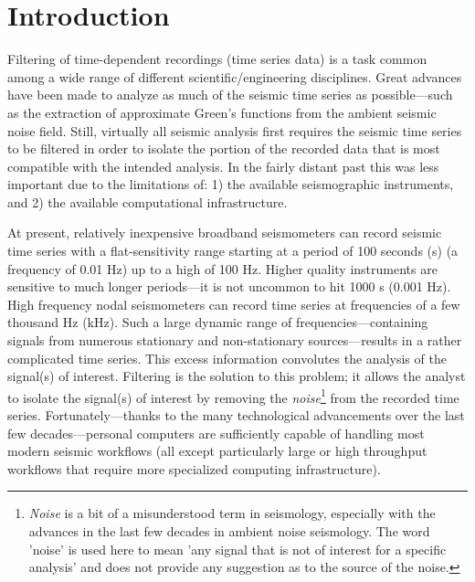 \documentclass[american, twoside]{article}
\begin{document}
\section{Introduction} \label{Introduction}
Filtering of time-dependent recordings (time series data) is a task common among a wide range of different scientific/engineering disciplines.
Great advances have been made to analyze as much of the seismic time series as possible---such as the extraction of approximate
Green's functions from the ambient seismic noise field. Still, virtually all seismic analysis first requires the seismic time series to
be filtered in order to isolate the portion of the recorded data that is most compatible with the intended analysis. In the fairly
distant past this was less important due to the limitations of: 1) the available seismographic instruments, and 2) the available
computational infrastructure.

At present, relatively inexpensive broadband seismometers can record seismic time series with a flat-sensitivity
range starting at a \gls{period} of 100 seconds (s) (a \gls{frequency} of 0.01 Hz) up to a high of 100 Hz. Higher quality instruments are sensitive to
much longer \glspl{period}---it is not uncommon to hit 1000 s (0.001 Hz). High \gls{frequency} nodal seismometers can record time series at frequencies of a few
thousand Hz (kHz). Such a large dynamic range of frequencies---containing signals from numerous stationary and non-stationary sources---results in a
rather complicated time series. This excess information convolutes the analysis of the signal(s) of interest.
Filtering is the solution to this problem; it allows the analyst to isolate the signal(s) of interest by removing the \textit{noise}\footnote{\textit{Noise} is a bit of a misunderstood term in
seismology, especially with the advances in the last few decades in ambient noise seismology. The word 'noise' is used here to mean 'any
signal that is not of interest for a specific analysis' and does not provide any suggestion as to the source of the noise.} from the
recorded time series. Fortunately---thanks to the many technological advancements over the last few decades---personal computers are sufficiently
capable of handling most modern seismic workflows (all except particularly large or high throughput workflows that require more specialized
computing infrastructure).
\end{document}
